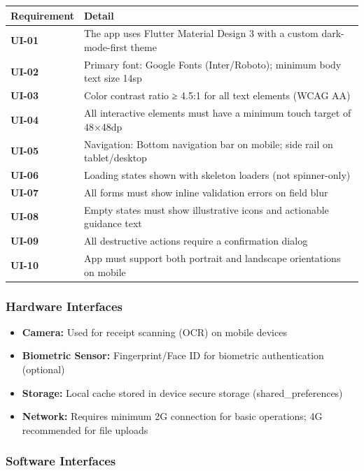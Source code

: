 \documentclass[journal, a4paper, onecolumn, 12pt]{IEEEtran}
\begin{document}
\begin{longtable}{|p{}|p{}|}
\hline
Requirement & Detail \\ \hline
\hline
\textbf{UI-01} & The app uses Flutter Material Design 3 with a custom dark-mode-first theme \\ \hline
\textbf{UI-02} & Primary font: Google Fonts (Inter/Roboto); minimum body text size 14sp \\ \hline
\textbf{UI-03} & Color contrast ratio ≥ 4.5:1 for all text elements (WCAG AA) \\ \hline
\textbf{UI-04} & All interactive elements must have a minimum touch target of 48×48dp \\ \hline
\textbf{UI-05} & Navigation: Bottom navigation bar on mobile; side rail on tablet/desktop \\ \hline
\textbf{UI-06} & Loading states shown with skeleton loaders (not spinner-only) \\ \hline
\textbf{UI-07} & All forms must show inline validation errors on field blur \\ \hline
\textbf{UI-08} & Empty states must show illustrative icons and actionable guidance text \\ \hline
\textbf{UI-09} & All destructive actions require a confirmation dialog \\ \hline
\textbf{UI-10} & App must support both portrait and landscape orientations on mobile \\ \hline
\end{longtable}
\subsubsection{Hardware Interfaces}
\begin{itemize}[leftmargin=*]
\item \textbf{Camera:} Used for receipt scanning (OCR) on mobile devices
\item \textbf{Biometric Sensor:} Fingerprint/Face ID for biometric authentication (optional)
\item \textbf{Storage:} Local cache stored in device secure storage (shared\_preferences)
\item \textbf{Network:} Requires minimum 2G connection for basic operations; 4G recommended for file uploads
\end{itemize}

\subsubsection{Software Interfaces}
\end{document}
